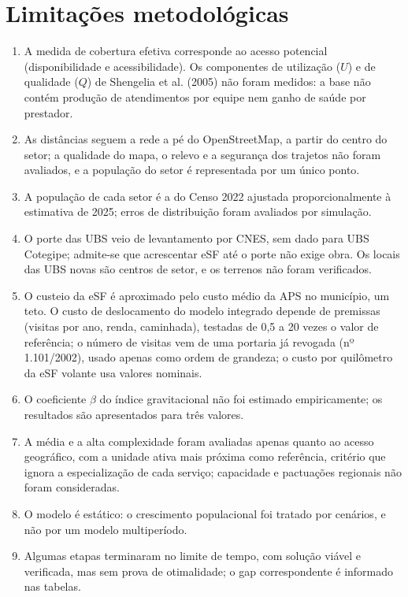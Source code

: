 \documentclass[11pt,a4paper]{article}
\begin{document}
\section{Limitações metodológicas}
\begin{enumerate}[label=\alph*),leftmargin=*,itemsep=2pt]
\item A medida de cobertura efetiva corresponde ao acesso potencial (disponibilidade e acessibilidade). Os componentes de utilização ($U$) e de qualidade ($Q$) de Shengelia et al. (2005) não foram medidos: a base não contém produção de atendimentos por equipe nem ganho de saúde por prestador.
\item As distâncias seguem a rede a pé do OpenStreetMap, a partir do centro do setor; a qualidade do mapa, o relevo e a segurança dos trajetos não foram avaliados, e a população do setor é representada por um único ponto.
\item A população de cada setor é a do Censo 2022 ajustada proporcionalmente à estimativa de 2025; erros de distribuição foram avaliados por simulação.
\item O porte das UBS veio de levantamento por CNES, sem dado para UBS Cotegipe; admite-se que acrescentar eSF até o porte não exige obra. Os locais das UBS novas são centros de setor, e os terrenos não foram verificados.
\item O custeio da eSF é aproximado pelo custo médio da APS no município, um teto. O custo de deslocamento do modelo integrado depende de premissas (visitas por ano, renda, caminhada), testadas de 0,5 a 20 vezes o valor de referência; o número de visitas vem de uma portaria já revogada (nº 1.101/2002), usado apenas como ordem de grandeza; o custo por quilômetro da eSF volante usa valores nominais.
\item O coeficiente $\beta $ do índice gravitacional não foi estimado empiricamente; os resultados são apresentados para três valores.
\item A média e a alta complexidade foram avaliadas apenas quanto ao acesso geográfico, com a unidade ativa mais próxima como referência, critério que ignora a especialização de cada serviço; capacidade e pactuações regionais não foram consideradas.
\item O modelo é estático: o crescimento populacional foi tratado por cenários, e não por um modelo multiperíodo.
\item Algumas etapas terminaram no limite de tempo, com solução viável e verificada, mas sem prova de otimalidade; o gap correspondente é informado nas tabelas.
\end{enumerate}
\end{document}
